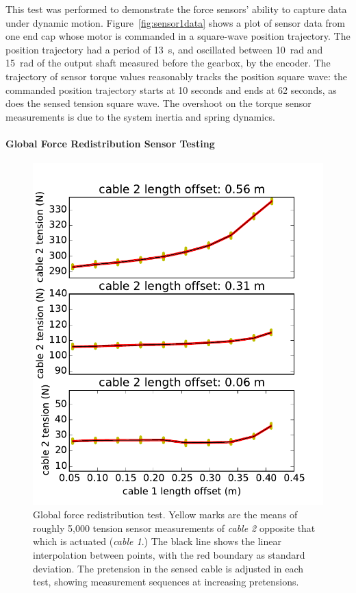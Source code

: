 \begin{appendices}
This test was performed to demonstrate the force sensors' ability to capture data under dynamic motion.
Figure~\ref{fig:sensor1data} shows a plot of sensor data from one end cap whose motor is commanded in a square-wave position trajectory.
The position trajectory had a period of \SI{13}{\second}, and oscillated between \SI{10}{\radian} and \SI{15}{\radian} of the output shaft measured before the gearbox, by the encoder.
The trajectory of sensor torque values reasonably tracks the position square wave: the commanded position trajectory starts at 10 seconds and ends at 62 seconds, as does the sensed tension square wave.
The overshoot on the torque sensor measurements is due to the system inertia and spring dynamics.

\paragraph{Global Force Redistribution Sensor Testing}
\begin{figure}[thpb]
      \centering
      \includegraphics[width=0.55\columnwidth]{tex/img/sensor2_original}
      \caption{Global force redistribution test. Yellow marks are the means of roughly 5,000 tension sensor measurements of \emph{cable 2} opposite that which is actuated (\emph{cable 1}.) The black line shows the linear interpolation between points, with the red boundary as standard deviation. The pretension in the sensed cable is adjusted in each test, showing measurement sequences at increasing pretensions.}
      \label{fig:sensor2data_forcedistribution}
\end{figure}


\end{appendices}
